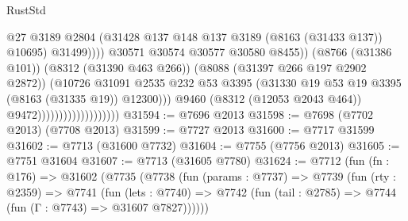 \begin{lexlean}{RustStd}
\begin{coremodule}
                                                        @27
                                                        @3189
                                                        @2804
                                                        (@31428
                                                          @137
                                                          @148
                                                          @137
                                                          @3189
                                                          (@8163 (@31433 @137))
                                                          @10695)
                                                        @31499))))
                                                @30571
                                                @30574
                                                @30577
                                                @30580
                                                @8455))
                                            (@8766 (@31386 @101))
                                            (@8312 (@31390 @463 @266))
                                            (@8088 (@31397 @266 @197 @2902 @2872))
                                            (@10726
                                              @31091
                                              @2535
                                              @232
                                              @53
                                              @3395
                                              (@31330
                                                @19
                                                @53
                                                @19
                                                @3395
                                                (@8163 (@31335 @19))
                                                @12300)))
                                          @9460
                                          (@8312 (@12053 @2043 @464))
                                          @9472)))))))))))))))))))
@31594 := @7696 @2013
@31598 := @7698 (@7702 @2013) (@7708 @2013)
@31599 := @7727 @2013
@31600 := @7717 @31599
@31602 := @7713 (@31600 @7732)
@31604 := @7755 (@7756 @2013)
@31605 := @7751 @31604
@31607 := @7713 (@31605 @7780)
@31624 := @7712
    (fun (fn : @176) =>
    @31602
      (@7735
        (@7738
          (fun (params : @7737) =>
          @7739
            (fun (rty : @2359) =>
            @7741
              (fun (lets : @7740) =>
              @7742 (fun (tail : @2785) => @7744 (fun (Γ : @7743) => @31607 @7827))))))

\end{coremodule}
\end{lexlean}
